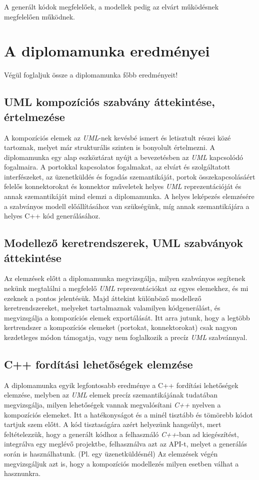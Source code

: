 \documentclass[a4paper,12pt]{report}
\begin{document}
A generált kódok megfelelőek, a modellek pedig az elvárt működésnek megfelelően működnek.

\chapter{A diplomamunka eredményei}
Végül foglaljuk össze a diplomamunka főbb eredményeit!
\section{UML kompozíciós szabvány áttekintése, értelmezése}
A kompozíciós elemek az \textit{UML}-nek kevésbé ismert és letisztult részei közé tartoznak, melyet már strukturális szinten is bonyolult értelmezni. A diplomamunka egy alap eszköztárat nyújt a bevezetésben az \textit{UML} kapcsolódó fogalmaira. A portokkal kapcsolatos fogalmakat, az elvárt és szolgáltatott interfészeket, az üzenetküldés és fogadás szemantikáját, portok összekapcsolásáért felelős konnektorokat és konnektor műveletek helyes \textit{UML} reprezentációját és annak szemantikáját mind elemzi a diplomamunka. A helyes leképezés elemzésére a szabványos modell előállításához van szükségünk, míg annak szemantikájára a helyes C++ kód generálásához.

\section{Modellező keretrendszerek, UML szabványok áttekintése}
Az elemzések előtt a diplomamunka megvizsgálja, milyen szabványos segítenek nekünk megtalálni a megfelelő \textit{UML} reprezentációkat az egyes elemekhez, és mi ezeknek a pontos jelentésük. Majd áttekint különböző modellező keretrendszereket, melyeket tartalmaznak valamilyen kódgenerálást, és megvizsgálja a kompozíciós elemek exportálását. Itt arra jutunk, hogy a legtöbb kertrendszer a kompozíciós elemeket (portokat, konnektorokat) csak nagyon kezdetleges módon támogatja, vagy nem foglalkozik a precíz \textit{UML} szabvánnyal.

\section{C++ fordítási lehetőségek elemzése}
A diplomamunka egyik legfontosabb eredménye a C++ fordítási lehetőségek elemzése, melyben az \textit{UML} elemek precíz szemantikájának tudatában megvizsgálja, milyen lehetőségek vannak megvalósítani \textit{C++} nyelven a kompozíciós elemeket. Itt a hatékonyságot és a minél tisztább és tömörebb kódot tartjuk szem előtt. A kód tisztaságára azért helyezünk hangsúlyt, mert feltételezzük, hogy a generált kódhoz a felhasználó \textit{C++}-ban ad kiegészítést, integrálva egy meglévő projektbe, felhasználva azt az API-t, melyet a generálás során is használhatunk. (Pl. egy üzenetküldésnél) Az elemzések végén megvizsgáljuk azt is, hogy a kompozíciós modellezés milyen esetben válhat a hasznunkra.
\end{document}
